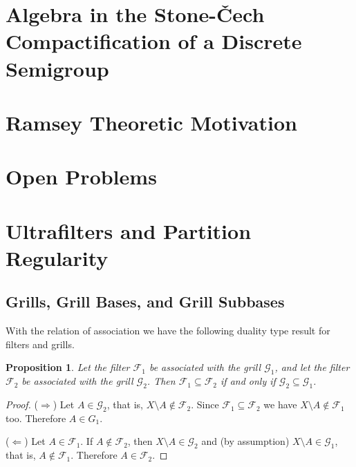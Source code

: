 \documentclass[12pt]{article}
\theoremstyle{plain}
\newtheorem{prop}[thm]{Proposition}
\theoremstyle{definition}
\newcommand{\calF}{\mathcal{F}}
\newcommand{\calG}{\mathcal{G}}
\begin{document}
\section{Algebra in the Stone-\v{C}ech Compactification of a Discrete Semigroup}
\section{Ramsey Theoretic Motivation}
\section*{Open Problems}
\section{Ultrafilters and Partition Regularity}

\subsection{Grills, Grill Bases, and Grill Subbases}



With the relation of association we have the following duality type result for filters and grills.

\begin{prop}
  Let the filter $\calF_1$ be associated with the grill $\calG_1$, and let the filter $\calF_2$ be associated with the grill $\calG_2$.
  Then $\calF_1 \subseteq \calF_2$ if and only if $\calG_2 \subseteq \calG_1$.
\end{prop}
\begin{proof}
  ($\Rightarrow$)
  Let $A \in \calG_2$, that is, $X \setminus A \not\in \calF_2$.
  Since $\calF_1 \subseteq \calF_2$ we have $X \setminus A \not\in \calF_1$ too.
  Therefore $A \in G_1$.

  ($\Leftarrow$)
  Let $A \in \calF_1$.
  If $A \not\in \calF_2$, then $X \setminus A \in \calG_2$ and (by assumption) $X \setminus A \in \calG_1$, that is, $A \not\in \calF_1$.
  Therefore $A \in \calF_2$.
\end{proof}
\end{document}
